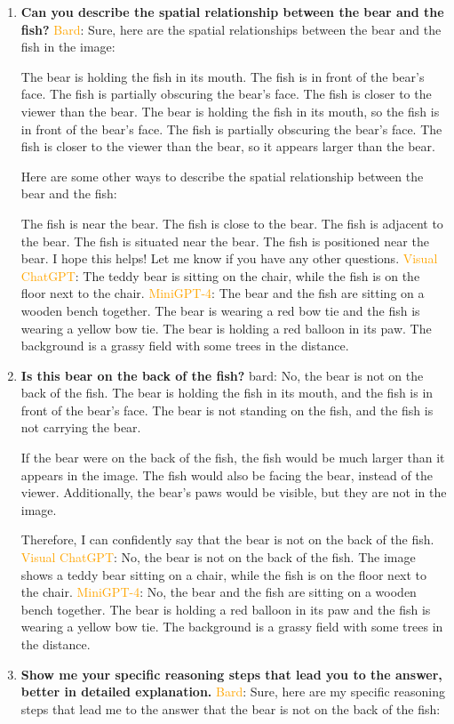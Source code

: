     \begin{enumerate}
        \item \textbf{Can you describe the spatial relationship between the bear and the fish?}
        \subitem \textcolor{orange}{Bard}:
        Sure, here are the spatial relationships between the bear and the fish in the image:

        The bear is holding the fish in its mouth.
        The fish is in front of the bear's face.
        The fish is partially obscuring the bear's face.
        The fish is closer to the viewer than the bear.
        The bear is holding the fish in its mouth, so the fish is in front of the bear's face. The fish is partially obscuring the bear's face. The fish is closer to the viewer than the bear, so it appears larger than the bear.

        Here are some other ways to describe the spatial relationship between the bear and the fish:

        The fish is near the bear.
        The fish is close to the bear.
        The fish is adjacent to the bear.
        The fish is situated near the bear.
        The fish is positioned near the bear.
        I hope this helps! Let me know if you have any other questions.
        \subitem \textcolor{orange}{Visual ChatGPT}: The teddy bear is sitting on the chair, while the fish is on the floor next to the chair.
        \subitem \textcolor{orange}{MiniGPT-4}: The bear and the fish are sitting on a wooden bench together. The bear is wearing a red bow tie and the fish is wearing a yellow bow tie. The bear is holding a red balloon in its paw. The background is a grassy field with some trees in the distance.
        \item \textbf{Is this bear on the back of the fish?}
        \subitem bard:
        No, the bear is not on the back of the fish. The bear is holding the fish in its mouth, and the fish is in front of the bear's face. The bear is not standing on the fish, and the fish is not carrying the bear.
        
        If the bear were on the back of the fish, the fish would be much larger than it appears in the image. The fish would also be facing the bear, instead of the viewer. Additionally, the bear's paws would be visible, but they are not in the image.
        
        Therefore, I can confidently say that the bear is not on the back of the fish.
        \subitem \textcolor{orange}{Visual ChatGPT}: No, the bear is not on the back of the fish. The image shows a teddy bear sitting on a chair, while the fish is on the floor next to the chair.
        \subitem \textcolor{orange}{MiniGPT-4}: No, the bear and the fish are sitting on a wooden bench together. The bear is holding a red balloon in its paw and the fish is wearing a yellow bow tie. The background is a grassy field with some trees in the distance.
        \item \textbf{Show me your specific reasoning steps that lead you to the answer, better in detailed explanation.}
        \subitem \textcolor{orange}{Bard}:
        Sure, here are my specific reasoning steps that lead me to the answer that the bear is not on the back of the fish:
        

\end{enumerate}
